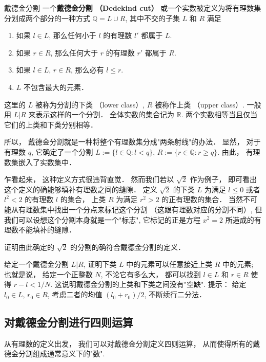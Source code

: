 \begin{definition}{戴德金分割}
一个\textbf{戴德金分割 （Dedekind cut）} 或一个实数被定义为将有理数集分划成两个部分的一种方式 $\mathbb{Q}=L\cup R$, 其中不交的子集 $L$ 和 $R$ 满足

\begin{enumerate}
\item 如果 $l\in L$, 那么任何小于 $l$ 的有理数 $l'$ 都属于 $L$.
\item 如果 $r\in R$, 那么任何大于 $r$ 的有理数 $r'$ 都属于 $R$.
\item 如果 $l\in L$, $r\in R$, 那么必有 $l\leq r$.
\item $L$ 不包含最大的元素．
\end{enumerate}

这里的 $L$ 被称为分割的下类 （lower class）, $R$ 被称作上类 （upper class）. 一般用 $L|R$ 来表示这样的一个分割． 全体实数的集合记为 $\mathbb{R}$. 两个实数相等当且仅当它们的上类和下类分别相等．
\end{definition}

所以， 戴德金分割就是一种将整个有理数集分成"两条射线"的办法． 显然， 对于有理数 $q$, 它确定了一个分割 $L:=\{l\in\mathbb{Q}:l<q\}$, $R:=\{r\in\mathbb{Q}:r\geq q\}$. 由此， 有理数集嵌入了实数集中．

乍看起来， 这种定义方式很违背直觉． 然而我们若以 $\sqrt{2}$ 作为例子， 即可看出这个定义的确能够填补有理数之间的缝隙． 定义 $\sqrt{2}$ 的下类 $L$ 为满足 $l\leq0$ 或者 $l^2<2$ 的有理数 $l$ 的集合， 上类 $R$ 为满足 $r^2>2$ 的正有理数的集合． 当然不可能从有理数集中找出一个分点来标记这个分割 （这跟有理数对应的分割不同）, 但我们可以设想这个分割本身就是一个"标志", 它标记的正是方程 $x^2=2$ 所造成的有理数不能填补的缝隙．
\begin{exercise}{}
证明由此确定的 $\sqrt{2}$ 的分割的确符合戴德金分割的定义．
\end{exercise}

\begin{exercise}{}
给定一个戴德金分割 $L|R$, 证明下类 $L$ 中的元素可以任意接近上类 $R$ 中的元素; 也就是说， 给定一个正整数 $N$, 不论它有多么大， 都可以找到 $l\in L$ 和 $r\in R$ 使得 $r-l<1/N$. 这说明戴德金分割的上类和下类之间没有"空缺". 提示： 给定 $l_0\in L$, $r_0\in R$, 考虑二者的均值 $(l_0+r_0)/2$, 不断续行二分法．
\end{exercise}

\subsection{对戴德金分割进行四则运算}
从有理数的定义出发， 我们可以对戴德金分割定义四则运算， 从而使得所有的戴德金分割组成通常意义下的"数". 


